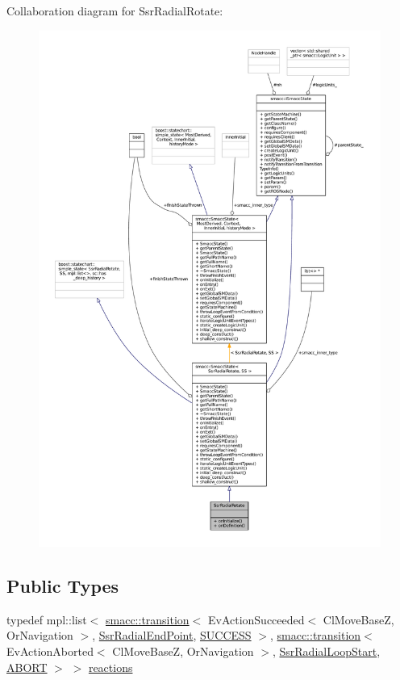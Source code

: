 Collaboration diagram for Ssr\+Radial\+Rotate\+:
\nopagebreak
\begin{figure}[H]
\begin{center}
\leavevmode
\includegraphics[width=350pt]{structSsrRadialRotate__coll__graph}
\end{center}
\end{figure}
\subsection*{Public Types}
\begin{DoxyCompactItemize}
\item 
typedef mpl\+::list$<$ \hyperlink{classsmacc_1_1transition}{smacc\+::transition}$<$ Ev\+Action\+Succeeded$<$ Cl\+Move\+BaseZ, Or\+Navigation $>$, \hyperlink{structSsrRadialEndPoint}{Ssr\+Radial\+End\+Point}, \hyperlink{classSUCCESS}{S\+U\+C\+C\+E\+SS} $>$, \hyperlink{classsmacc_1_1transition}{smacc\+::transition}$<$ Ev\+Action\+Aborted$<$ Cl\+Move\+BaseZ, Or\+Navigation $>$, \hyperlink{structSsrRadialLoopStart}{Ssr\+Radial\+Loop\+Start}, \hyperlink{classABORT}{A\+B\+O\+RT} $>$ $>$ \hyperlink{structSsrRadialRotate_ab3188b2cc27335cc88a33a63abd38ee0}{reactions}
\end{DoxyCompactItemize}
